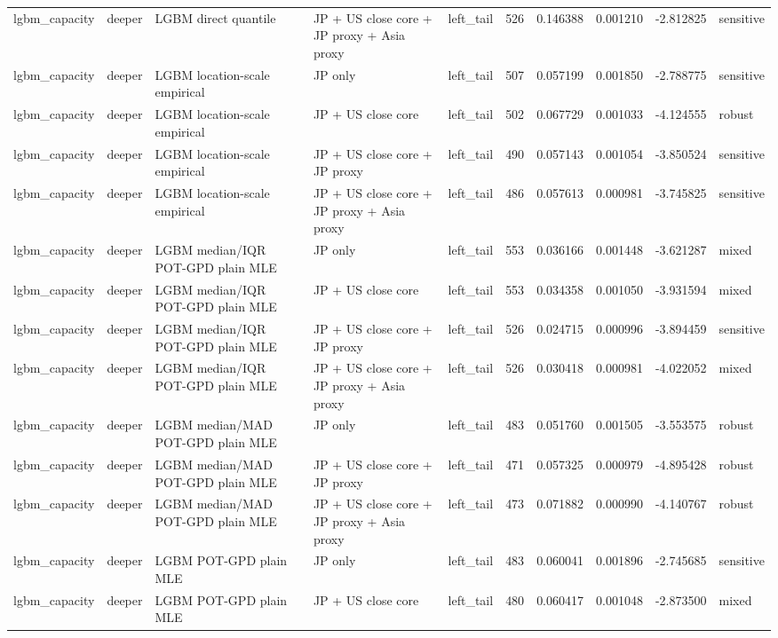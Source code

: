\begin{tabular}{lll l lrrrrl}
lgbm\_capacity & deeper & LGBM direct quantile & JP + US close core + JP proxy + Asia proxy & left\_tail & 526 & 0.146388 & 0.001210 & -2.812825 & sensitive \\
lgbm\_capacity & deeper & LGBM location-scale empirical & JP only & left\_tail & 507 & 0.057199 & 0.001850 & -2.788775 & sensitive \\
lgbm\_capacity & deeper & LGBM location-scale empirical & JP + US close core & left\_tail & 502 & 0.067729 & 0.001033 & -4.124555 & robust \\
lgbm\_capacity & deeper & LGBM location-scale empirical & JP + US close core + JP proxy & left\_tail & 490 & 0.057143 & 0.001054 & -3.850524 & sensitive \\
lgbm\_capacity & deeper & LGBM location-scale empirical & JP + US close core + JP proxy + Asia proxy & left\_tail & 486 & 0.057613 & 0.000981 & -3.745825 & sensitive \\
lgbm\_capacity & deeper & LGBM median/IQR POT-GPD plain MLE & JP only & left\_tail & 553 & 0.036166 & 0.001448 & -3.621287 & mixed \\
lgbm\_capacity & deeper & LGBM median/IQR POT-GPD plain MLE & JP + US close core & left\_tail & 553 & 0.034358 & 0.001050 & -3.931594 & mixed \\
lgbm\_capacity & deeper & LGBM median/IQR POT-GPD plain MLE & JP + US close core + JP proxy & left\_tail & 526 & 0.024715 & 0.000996 & -3.894459 & sensitive \\
lgbm\_capacity & deeper & LGBM median/IQR POT-GPD plain MLE & JP + US close core + JP proxy + Asia proxy & left\_tail & 526 & 0.030418 & 0.000981 & -4.022052 & mixed \\
lgbm\_capacity & deeper & LGBM median/MAD POT-GPD plain MLE & JP only & left\_tail & 483 & 0.051760 & 0.001505 & -3.553575 & robust \\
lgbm\_capacity & deeper & LGBM median/MAD POT-GPD plain MLE & JP + US close core + JP proxy & left\_tail & 471 & 0.057325 & 0.000979 & -4.895428 & robust \\
lgbm\_capacity & deeper & LGBM median/MAD POT-GPD plain MLE & JP + US close core + JP proxy + Asia proxy & left\_tail & 473 & 0.071882 & 0.000990 & -4.140767 & robust \\
lgbm\_capacity & deeper & LGBM POT-GPD plain MLE & JP only & left\_tail & 483 & 0.060041 & 0.001896 & -2.745685 & sensitive \\
lgbm\_capacity & deeper & LGBM POT-GPD plain MLE & JP + US close core & left\_tail & 480 & 0.060417 & 0.001048 & -2.873500 & mixed \\

\end{tabular}
